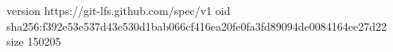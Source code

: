 version https://git-lfs.github.com/spec/v1
oid sha256:f392e53e537d43e530d1bab066cf416ea20fe0fa3fd89094de0084164ee27d22
size 150205

